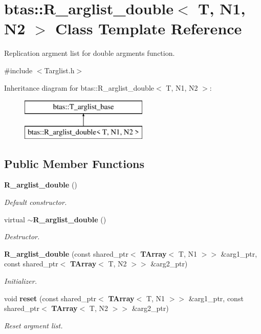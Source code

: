 \section{btas\-:\-:R\-\_\-arglist\-\_\-double$<$ T, N1, N2 $>$ Class Template Reference}
\label{d5/dcd/classbtas_1_1R__arglist__double}


Replication argment list for double argments function.  




{\ttfamily \#include $<$Targlist.\-h$>$}

Inheritance diagram for btas\-:\-:R\-\_\-arglist\-\_\-double$<$ T, N1, N2 $>$\-:\begin{figure}[H]
\begin{center}
\leavevmode
\includegraphics[height=2.000000cm]{d5/dcd/classbtas_1_1R__arglist__double}
\end{center}
\end{figure}
\subsection*{Public Member Functions}
\begin{DoxyCompactItemize}
\item 
{\bf R\-\_\-arglist\-\_\-double} ()
\begin{DoxyCompactList}\small\item\em Default constructor. \end{DoxyCompactList}\item 
virtual {\bf $\sim$\-R\-\_\-arglist\-\_\-double} ()
\begin{DoxyCompactList}\small\item\em Destructor. \end{DoxyCompactList}\item 
{\bf R\-\_\-arglist\-\_\-double} (const shared\-\_\-ptr$<$ {\bf T\-Array}$<$ T, N1 $>$$>$ \&arg1\-\_\-ptr, const shared\-\_\-ptr$<$ {\bf T\-Array}$<$ T, N2 $>$$>$ \&arg2\-\_\-ptr)
\begin{DoxyCompactList}\small\item\em Initializer. \end{DoxyCompactList}\item 
void {\bf reset} (const shared\-\_\-ptr$<$ {\bf T\-Array}$<$ T, N1 $>$$>$ \&arg1\-\_\-ptr, const shared\-\_\-ptr$<$ {\bf T\-Array}$<$ T, N2 $>$$>$ \&arg2\-\_\-ptr)
\begin{DoxyCompactList}\small\item\em Reset argment list. \end{DoxyCompactList}\end{DoxyCompactItemize}
